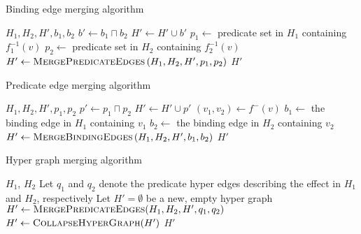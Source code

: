 \documentclass[../Master.tex]{subfiles}
\begin{document}
\begin{algorithm}
    \caption{Binding edge merging algorithm}
    \label{algo:bindingedgemerge}
    \begin{algorithmic}
         {$H_1, H_2, H', b_1, b_2$}
            \State $b' \gets b_1 \sqcap b_2$
            \State $H' \gets H' \cup b'$
                    \State $p_1 \gets$ predicate set in $H_1$ containing $f_1^{-1}(v)$
                    \State $p_2 \gets$ predicate set in $H_2$ containing $f_2^{-1}(v)$
                    \State $H' \gets \textsc{MergePredicateEdges}
                                        \left( H_1, H_2, H', p_1, p_2 \right)$
                \EndIf
            \EndFor
            \State \Return $H'$
        \EndFunction
    \end{algorithmic}
\end{algorithm}

\begin{algorithm}
    \caption{Predicate edge merging algorithm}
    \label{algo:prededgemerge}

    \begin{algorithmic}
         {$H_1, H_2, H', p_1, p_2$}
            \State $p' \gets p_1 \sqcap p_2$
            \State $H' \gets H' \cup p'$
                    \State $\left( v_1, v_2 \right) \gets f^-\left( v \right)$
                    \State $b_1 \gets$ the binding edge in $H_1$ containing $v_1$
                    \State $b_2 \gets$ the binding edge in $H_2$ containing $v_2$
                    \State $H' \gets \textsc{MergeBindingEdges}
                        \left( H_1, H_2, H', b_1, b_2 \right)$
                \EndIf
            \EndFor
            \State \Return $H'$
        \EndFunction
    \end{algorithmic}
\end{algorithm}

\begin{algorithm}
    \caption{Hyper graph merging algorithm}
    \label{algo:hypergraphmerge}
    \begin{algorithmic}
         {$H_1$, $H_2$}
            \State Let $q_1$ and $q_2$ denote the predicate hyper edges describing the effect in $H_1$ and $H_2$, respectively
            \State Let $H' = \emptyset$ be a new, empty hyper graph
            \State $H' \gets \textsc{MergePredicateEdges}(H_1,H_2,H',q_1,q_2)$
            \State $H' \gets \textsc{CollapseHyperGraph}(H')$
            \State \Return $H'$
        \EndFunction
    \end{algorithmic}
\end{algorithm}
\end{document}
